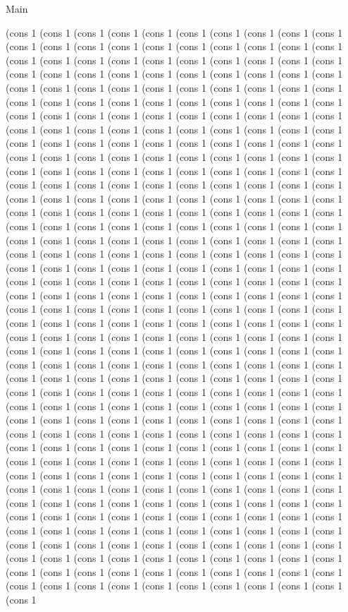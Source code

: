 \begin{lexlean}{Main}
\begin{semanticmodule}
(cons 1 (cons 1 (cons 1 (cons 1 (cons 1 (cons 1 (cons 1 (cons 1 (cons 1 (cons 1 (cons 1 (cons 1 (cons 1 (cons 1 (cons 1 (cons 1 (cons 1 (cons 1 (cons 1 (cons 1 (cons 1 (cons 1 (cons 1 (cons 1 (cons 1 (cons 1 (cons 1 (cons 1 (cons 1 (cons 1 (cons 1 (cons 1 (cons 1 (cons 1 (cons 1 (cons 1 (cons 1 (cons 1 (cons 1 (cons 1 (cons 1 (cons 1 (cons 1 (cons 1 (cons 1 (cons 1 (cons 1 (cons 1 (cons 1 (cons 1 (cons 1 (cons 1 (cons 1 (cons 1 (cons 1 (cons 1 (cons 1 (cons 1 (cons 1 (cons 1 (cons 1 (cons 1 (cons 1 (cons 1 (cons 1 (cons 1 (cons 1 (cons 1 (cons 1 (cons 1 (cons 1 (cons 1 (cons 1 (cons 1 (cons 1 (cons 1 (cons 1 (cons 1 (cons 1 (cons 1 (cons 1 (cons 1 (cons 1 (cons 1 (cons 1 (cons 1 (cons 1 (cons 1 (cons 1 (cons 1 (cons 1 (cons 1 (cons 1 (cons 1 (cons 1 (cons 1 (cons 1 (cons 1 (cons 1 (cons 1 (cons 1 (cons 1 (cons 1 (cons 1 (cons 1 (cons 1 (cons 1 (cons 1 (cons 1 (cons 1 (cons 1 (cons 1 (cons 1 (cons 1 (cons 1 (cons 1 (cons 1 (cons 1 (cons 1 (cons 1 (cons 1 (cons 1 (cons 1 (cons 1 (cons 1 (cons 1 (cons 1 (cons 1 (cons 1 (cons 1 (cons 1 (cons 1 (cons 1 (cons 1 (cons 1 (cons 1 (cons 1 (cons 1 (cons 1 (cons 1 (cons 1 (cons 1 (cons 1 (cons 1 (cons 1 (cons 1 (cons 1 (cons 1 (cons 1 (cons 1 (cons 1 (cons 1 (cons 1 (cons 1 (cons 1 (cons 1 (cons 1 (cons 1 (cons 1 (cons 1 (cons 1 (cons 1 (cons 1 (cons 1 (cons 1 (cons 1 (cons 1 (cons 1 (cons 1 (cons 1 (cons 1 (cons 1 (cons 1 (cons 1 (cons 1 (cons 1 (cons 1 (cons 1 (cons 1 (cons 1 (cons 1 (cons 1 (cons 1 (cons 1 (cons 1 (cons 1 (cons 1 (cons 1 (cons 1 (cons 1 (cons 1 (cons 1 (cons 1 (cons 1 (cons 1 (cons 1 (cons 1 (cons 1 (cons 1 (cons 1 (cons 1 (cons 1 (cons 1 (cons 1 (cons 1 (cons 1 (cons 1 (cons 1 (cons 1 (cons 1 (cons 1 (cons 1 (cons 1 (cons 1 (cons 1 (cons 1 (cons 1 (cons 1 (cons 1 (cons 1 (cons 1 (cons 1 (cons 1 (cons 1 (cons 1 (cons 1 (cons 1 (cons 1 (cons 1 (cons 1 (cons 1 (cons 1 (cons 1 (cons 1 (cons 1 (cons 1 (cons 1 (cons 1 (cons 1 (cons 1 (cons 1 (cons 1 (cons 1 (cons 1 (cons 1 (cons 1 (cons 1 (cons 1 (cons 1 (cons 1 (cons 1 (cons 1 (cons 1 (cons 1 (cons 1 (cons 1 (cons 1 (cons 1 (cons 1 (cons 1 (cons 1 (cons 1 (cons 1 (cons 1 (cons 1 (cons 1 (cons 1 (cons 1 (cons 1 (cons 1 (cons 1 (cons 1 (cons 1 (cons 1 (cons 1 (cons 1 (cons 1 (cons 1 (cons 1 (cons 1 (cons 1 (cons 1 (cons 1 (cons 1 (cons 1 (cons 1 (cons 1 (cons 1 (cons 1 (cons 1 (cons 1 (cons 1 (cons 1 (cons 1 (cons 1 (cons 1 (cons 1 (cons 1 (cons 1 (cons 1 (cons 1 (cons 1 (cons 1 (cons 1 (cons 1 (cons 1 (cons 1 (cons 1 (cons 1 (cons 1 (cons 1 (cons 1 (cons 1 (cons 1 (cons 1 (cons 1 (cons 1 (cons 1 (cons 1 (cons 1 (cons 1 (cons 1 (cons 1 (cons 1 (cons 1 (cons 1 (cons 1 (cons 1 (cons 1 (cons 1 (cons 1 (cons 1 (cons 1 (cons 1 (cons 1 (cons 1 (cons 1 (cons 1 (cons 1 (cons 1 (cons 1 (cons 1 (cons 1 (cons 1 (cons 1 (cons 1 (cons 1 (cons 1 (cons 1 (cons 1 (cons 1 (cons 1 (cons 1 (cons 1 (cons 1 (cons 1 (cons 1 (cons 1 (cons 1 (cons 1 (cons 1 (cons 1 (cons 1 (cons 1 (cons 1 (cons 1 (cons 1 (cons 1 (cons 1 (cons 1 (cons 1 (cons 1 (cons 1 (cons 1 (cons 1 (cons 1 (cons 1 (cons 1 (cons 1 (cons 1 (cons 1 (cons 1 (cons 1 (cons 1 (cons 1 (cons 1 (cons 1 (cons 1 (cons 1 (cons 1 (cons 1 (cons 1 (cons 1 (cons 1 (cons 1 (cons 1 (cons 1 (cons 1 (cons 1 (cons 1 (cons 1 (cons 1 (cons 1 (cons 1 (cons 1 (cons 1 (cons 1 (cons 1 (cons 1 (cons 1 (cons 1 
\end{semanticmodule}
\end{lexlean}
